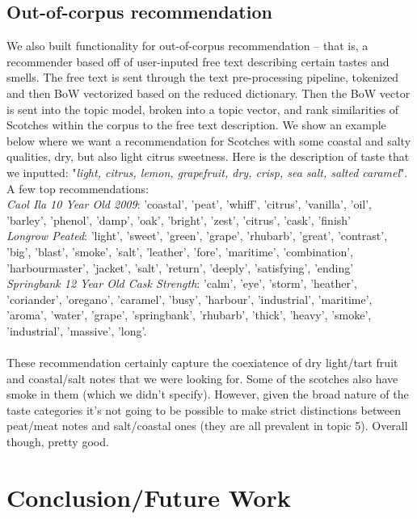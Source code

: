 \documentclass{article}
\begin{document}
\subsection{Out-of-corpus recommendation}
We also built functionality for out-of-corpus recommendation -- that is, a recommender based off of user-inputed free text describing certain tastes and smells. The free text is sent through the text pre-processing pipeline, tokenized and then BoW vectorized based on the reduced dictionary. Then the BoW vector is sent into the topic model, broken into a topic vector, and rank similarities of Scotches within the corpus to the free text description. We show an example below where we want a recommendation for Scotches with some coastal and salty qualities, dry, but also light citrus sweetness. Here is the description of taste that we inputted: "\textit{light, citrus, lemon, grapefruit, dry, crisp, sea salt, salted caramel}".\\
A few top recommendations:\\
\textit{Caol Ila 10 Year Old 2009}: 'coastal', 'peat', 'whiff', 'citrus', 'vanilla', 'oil', 'barley', 'phenol', 'damp', 'oak', 'bright', 'zest', 'citrus', 'cask', 'finish' \\
\textit{Longrow Peated}: 'light', 'sweet', 'green', 'grape', 'rhubarb', 'great', 'contrast', 'big', 'blast', 'smoke', 'salt', 'leather', 'fore', 'maritime', 'combination', 'harbourmaster', 'jacket', 'salt', 'return', 'deeply', 'satisfying', 'ending' \\
\textit{Springbank 12 Year Old Cask Strength}: 'calm', 'eye', 'storm', 'heather', 'coriander', 'oregano', 'caramel', 'busy', 'harbour', 'industrial', 'maritime', 'aroma', 'water', 'grape', 'springbank', 'rhubarb', 'thick', 'heavy', 'smoke', 'industrial', 'massive', 'long'.
\paragraph{} These recommendation certainly capture the coexiatence of dry light/tart fruit and coastal/salt notes that we were looking for. Some of the scotches also have smoke in them (which we didn't specify). However, given the broad nature of the taste categories it's not going to be possible to make strict distinctions between peat/meat notes and salt/coastal ones (they are all prevalent in topic 5). Overall though, pretty good.
\section{Conclusion/Future Work}
\end{document}
